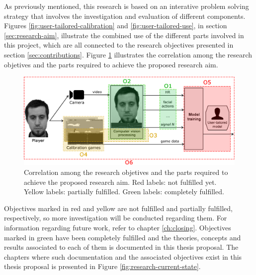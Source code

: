 As previously mentioned, this research is based on an interative problem solving strategy that involves the investigation and evaluation of different components. Figures \ref{fig:user-tailored-calibration} and \ref{fig:user-tailored-use}, in section \ref{sec:research-aim}, illustrate the combined use of the different parts involved in this project, which are all connected to the research objectives presented in section \ref{sec:contributions}. Figure \ref{fig:components-objectives} illustrates the correlation among the research objetives and the parts required to achieve the proposed research aim.

\begin{figure}[h]
    \centering
    \includegraphics[width=\textwidth]{figures/components-objectives.png}
    \caption{Correlation among the research objetives and the parts required to achieve the proposed research aim. Red labels: not fulfilled yet. Yellow labels: partially fulfilled. Green labels: completely fulfilled.}
    \label{fig:components-objectives}
\end{figure}

Objectives marked in red and yellow are not fulfilled and partially fulfilled, respectively, so more investigation will be conducted regarding them. For information regarding future work, refer to chapter \ref{ch:closing}. Objectives marked in green have been completely fulfilled and the theories, concepts and results associated to each of them is documented in this thesis proposal. The chapters where such documentation and the associated objectives exist in this thesis proposal is presented in Figure \ref{fig:research-current-state}.

